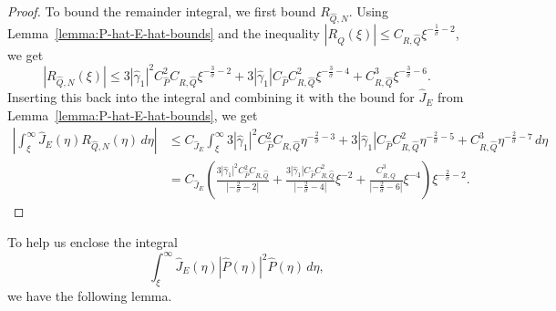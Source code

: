 \documentclass[11pt]{article}
\begin{document}
\begin{proof}
  To bound the remainder integral, we first bound \(R_{\hat{Q},N}\).
  Using Lemma~\ref{lemma:P-hat-E-hat-bounds} and the inequality
  \(|R_{\hat{Q}}(\xi)| \leq C_{R,\hat{Q}}\xi^{-\frac{1}{\sigma} -
    2}\), we get
  \begin{equation*}
    |R_{\hat{Q},N}(\xi)|
    \leq 3|\hat{\gamma}_{1}|^{2}C_{\hat{P}}^{2}C_{R,\hat{Q}}\xi^{-\frac{3}{\sigma} - 2}
    + 3|\hat{\gamma}_{1}|C_{\hat{P}}C_{R,\hat{Q}}^{2}\xi^{-\frac{3}{\sigma} - 4}
    + C_{R,\hat{Q}}^{3}\xi^{-\frac{3}{\sigma} - 6}.
  \end{equation*}
  Inserting this back into the integral and combining it with the
  bound for \(\hat{J}_{E}\) from
  Lemma~\ref{lemma:P-hat-E-hat-bounds}, we get
  \begin{equation*}
    \begin{split}
      \left|\int_{\xi}^{\infty} \hat{J}_{E}(\eta)R_{\hat{Q},N}(\eta)\,d\eta\right|
      &\leq C_{\hat{J}_{E}}\int_{\xi}^{\infty}
        3|\hat{\gamma}_{1}|^{2}C_{\hat{P}}^{2}C_{R,\hat{Q}}\eta^{-\frac{2}{\sigma} - 3}
      + 3|\hat{\gamma}_{1}|C_{\hat{P}}C_{R,\hat{Q}}^{2}\eta^{-\frac{2}{\sigma} - 5}
      + C_{R,\hat{Q}}^{3}\eta^{-\frac{2}{\sigma} - 7}\,d\eta\\
      &= C_{\hat{J}_{E}}
        \left(
        \frac{3|\hat{\gamma}_{1}|^{2}C_{\hat{P}}^{2}C_{R,\hat{Q}}}{|-\frac{2}{\sigma} - 2|}
      + \frac{3|\hat{\gamma}_{1}|C_{\hat{P}}C_{R,\hat{Q}}^{2}}{|-\frac{2}{\sigma} - 4|}\xi^{-2}
      + \frac{C_{R,\hat{Q}}^{3}}{|-\frac{2}{\sigma} - 6|}\xi^{-4}
        \right)\xi^{-\frac{2}{\sigma} - 2}.
    \end{split}
  \end{equation*}
\end{proof}

To help us enclose the integral
\begin{equation*}
  \int_{\xi}^{\infty} \hat{J}_{E}(\eta)|\hat{P}(\eta)|^{2}\hat{P}(\eta)\,d\eta,
\end{equation*}
we have the following lemma.
\end{document}
